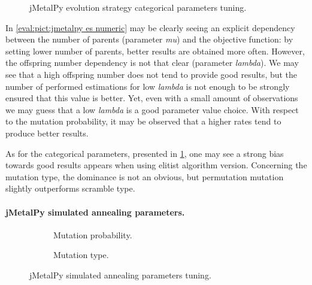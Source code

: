 \begin{figure}[h!]
	\centering
	\vspace{-20pt}
	
	\caption{jMetalPy evolution strategy categorical parameters tuning.}
	\label{eval:pict:jmetalpy es categoric}
	\vspace{-20pt}
\end{figure}

In \cref{eval:pict:jmetalpy es numeric} may be clearly seeing an explicit dependency between the number of parents (parameter \emph{mu}) and the objective function: by setting lower number of parents, better results are obtained more often. However, the offspring number dependency is not that clear (parameter \emph{lambda}). We may see that a high offspring number does not tend to provide good results, but the number of performed estimations for low \emph{lambda} is not enough to be strongly ensured that this value is better. Yet, even with a small amount of observations we may guess that a low \emph{lambda} is a good parameter value choice. With respect to the mutation probability, it may be observed that a higher rates tend to produce better results. 

As for the categorical parameters, presented in \cref{eval:pict:jmetalpy es categoric}, one may see a strong bias towards good results appears when using elitist algorithm version. Concerning the mutation type, the dominance is not an obvious, but permutation mutation slightly outperforms scramble type.


\paragraph{jMetalPy simulated annealing parameters.}
\begin{figure}[h]
	\centering
	\begin{subfigure}{0.35\textwidth}
		\vspace{-10pt}
		
		\caption{Mutation probability.}
		\label{eval:pict:jmetalpy sa numeric}
	\end{subfigure}
	\hfil 
	\begin{subfigure}{0.4\textwidth}
		
		\vspace{-5pt}
		\caption{Mutation type.}
		\label{eval:pict:jmetalpy sa categoric}
	\end{subfigure}
	\caption{jMetalPy simulated annealing parameters tuning.}
\end{figure}

